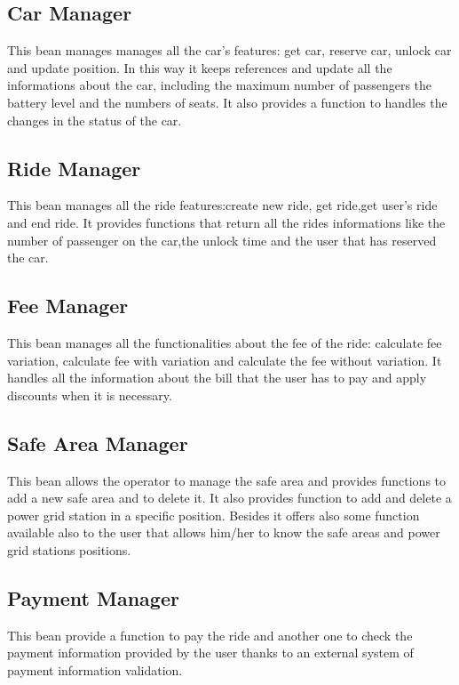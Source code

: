 \subsection{Car Manager}
This bean manages manages all the car's features: get car, reserve car, unlock car and update position.
In this way it keeps references and update all the informations about the car, including the maximum number of passengers the battery level and the numbers of seats.
It also provides a function to handles the changes in the status of the car.

\subsection{Ride Manager}
This bean manages all the ride features:create new ride, get ride,get user's ride and end ride.
It provides functions that return all the rides informations like the number of passenger on the car,the unlock time and the user that has reserved the car.

\subsection{Fee Manager}
This bean manages all the functionalities about the fee of the ride: calculate fee variation, calculate fee with variation and calculate the fee without variation.
It handles all the information about the bill that the user has to pay and apply discounts when it is necessary.

\subsection{Safe Area Manager}
This bean allows the operator to manage the safe area and provides functions to add a new safe area and to delete it. It also provides function to add and delete a power grid station in a specific position.
Besides it offers also some function available also to the user that allows him/her to know the safe areas and power grid stations positions.

\subsection{Payment Manager}
This bean provide a function to pay the ride and another one to check the payment information provided by the user thanks to an external system of payment information validation.